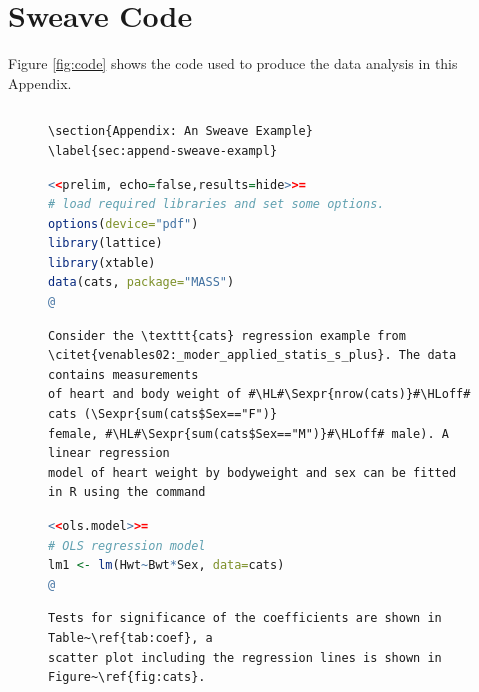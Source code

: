 \documentclass[11pt,article,oneside]{memoir}
\begin{document}
 
\section*{Sweave Code} %
\label{app:sweave_code}

\label{app:sweave-code}
Figure \ref{fig:code} shows the code used to produce the data analysis in this Appendix.

\begin{figure}
\begin{lstlisting}[style=sweave-top]

\end{lstlisting} 
\begin{lstlisting}[language={[latex]tex},numbers=none,style=sweave-tex]   
\section{Appendix: An Sweave Example}
\label{sec:append-sweave-exampl}
\end{lstlisting}
\begin{lstlisting}[language=R,numbers=none,style=sweave-r] 
<<prelim, echo=false,results=hide>>=
# load required libraries and set some options.
options(device="pdf")
library(lattice)
library(xtable)
data(cats, package="MASS")
@ 
\end{lstlisting}
\begin{lstlisting}[language={[latex]tex},numbers=none,style=sweave-tex] 
Consider the \texttt{cats} regression example from 
\citet{venables02:_moder_applied_statis_s_plus}. The data contains measurements 
of heart and body weight of #\HL#\Sexpr{nrow(cats)}#\HLoff# cats (\Sexpr{sum(cats$Sex=="F")}
female, #\HL#\Sexpr{sum(cats$Sex=="M")}#\HLoff# male). A linear regression
model of heart weight by bodyweight and sex can be fitted in R using the command
\end{lstlisting} 
\begin{lstlisting}[language=R,numbers=none,style=sweave-r] 
<<ols.model>>=
# OLS regression model 
lm1 <- lm(Hwt~Bwt*Sex, data=cats)
@ 
\end{lstlisting}
\begin{lstlisting}[language={[latex]tex},numbers=none,style=sweave-tex] 
Tests for significance of the coefficients are shown in Table~\ref{tab:coef}, a 
scatter plot including the regression lines is shown in Figure~\ref{fig:cats}.
\end{lstlisting}


\end{figure}
\end{document}
